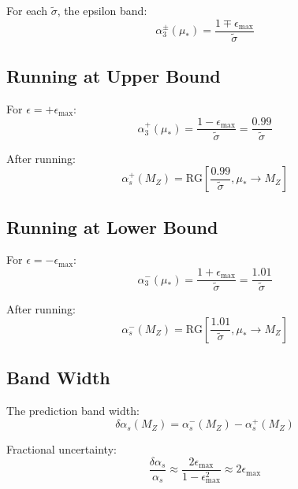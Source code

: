 \documentclass[11pt,a4paper]{article}
\theoremstyle{definition}
\begin{document}
For each $\tilde{\sigma}$, the epsilon band:
\begin{equation}
\label{eq:eps-band-formula}
\alpha_3^{\pm}(\mu_*) = \frac{1 \mp \epsilon_{\max}}{\tilde{\sigma}}
\end{equation}

\subsection{Running at Upper Bound}
\label{subsec:running-upper}

For $\epsilon = +\epsilon_{\max}$:
\begin{equation}
\label{eq:run-upper}
\alpha_3^{+}(\mu_*) = \frac{1 - \epsilon_{\max}}{\tilde{\sigma}} = \frac{0.99}{\tilde{\sigma}}
\end{equation}

After running:
\begin{equation}
\label{eq:run-upper-mz}
\alpha_s^{+}(M_Z) = \text{RG}\left[\frac{0.99}{\tilde{\sigma}}, \mu_* \to M_Z\right]
\end{equation}

\subsection{Running at Lower Bound}
\label{subsec:running-lower}

For $\epsilon = -\epsilon_{\max}$:
\begin{equation}
\label{eq:run-lower}
\alpha_3^{-}(\mu_*) = \frac{1 + \epsilon_{\max}}{\tilde{\sigma}} = \frac{1.01}{\tilde{\sigma}}
\end{equation}

After running:
\begin{equation}
\label{eq:run-lower-mz}
\alpha_s^{-}(M_Z) = \text{RG}\left[\frac{1.01}{\tilde{\sigma}}, \mu_* \to M_Z\right]
\end{equation}

\subsection{Band Width}
\label{subsec:band-width-detail}

The prediction band width:
\begin{equation}
\label{eq:band-width-detail}
\delta\alpha_s(M_Z) = \alpha_s^{-}(M_Z) - \alpha_s^{+}(M_Z)
\end{equation}

Fractional uncertainty:
\begin{equation}
\label{eq:fractional-uncert}
\frac{\delta\alpha_s}{\alpha_s} \approx \frac{2\epsilon_{\max}}{1 - \epsilon_{\max}^2} \approx 2\epsilon_{\max}
\end{equation}
\end{document}
